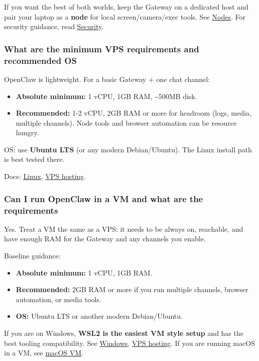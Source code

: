 If you want the best of both worlds, keep the Gateway on a dedicated host and pair your laptop as a \textbf{node} for local screen/camera/exec tools. See \href{/nodes}{Nodes}.
For security guidance, read \href{/gateway/security}{Security}.

\subsubsection{What are the minimum VPS requirements and recommended OS}


OpenClaw is lightweight. For a basic Gateway + one chat channel:

\begin{itemize}
  \item \textbf{Absolute minimum:} 1 vCPU, 1GB RAM, \textasciitilde{}500MB disk.
  \item \textbf{Recommended:} 1-2 vCPU, 2GB RAM or more for headroom (logs, media, multiple channels). Node tools and browser automation can be resource hungry.
\end{itemize}


OS: use \textbf{Ubuntu LTS} (or any modern Debian/Ubuntu). The Linux install path is best tested there.

Docs: \href{/platforms/linux}{Linux}, \href{/vps}{VPS hosting}.

\subsubsection{Can I run OpenClaw in a VM and what are the requirements}


Yes. Treat a VM the same as a VPS: it needs to be always on, reachable, and have enough
RAM for the Gateway and any channels you enable.

Baseline guidance:

\begin{itemize}
  \item \textbf{Absolute minimum:} 1 vCPU, 1GB RAM.
  \item \textbf{Recommended:} 2GB RAM or more if you run multiple channels, browser automation, or media tools.
  \item \textbf{OS:} Ubuntu LTS or another modern Debian/Ubuntu.
\end{itemize}


If you are on Windows, \textbf{WSL2 is the easiest VM style setup} and has the best tooling
compatibility. See \href{/platforms/windows}{Windows}, \href{/vps}{VPS hosting}.
If you are running macOS in a VM, see \href{/install/macos-vm}{macOS VM}.

